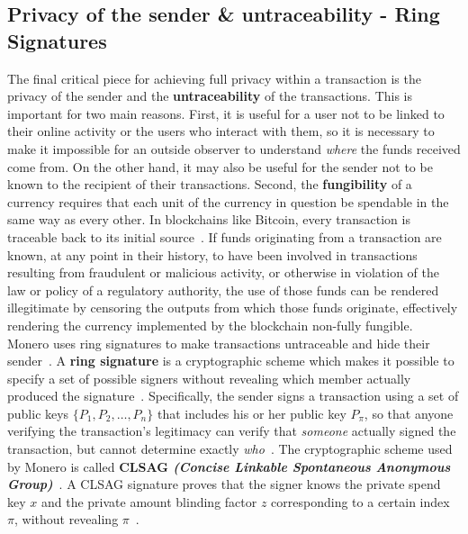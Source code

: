 \documentclass[conference]{IEEEtran}
\begin{document}

\subsection{Privacy of the sender \& untraceability - Ring Signatures}\label{subsec:ring_signatures}
The final critical piece for achieving full privacy within a transaction is the privacy of the sender and the \textbf{untraceability} of the transactions. This is important for two main reasons. First, it is useful for a user not to be linked to their online activity or the users who interact with them, so it is necessary to make it impossible for an outside observer to understand \textit{where} the funds received come from. On the other hand, it may also be useful for the sender not to be known to the recipient of their transactions. Second, the \textbf{fungibility} of a currency requires that each unit of the currency in question be spendable in the same way as every other. In blockchains like Bitcoin, every transaction is traceable back to its initial source~\cite{bitcoin_auditable}. If funds originating from a transaction are known, at any point in their history, to have been involved in transactions resulting from fraudulent or malicious activity, or otherwise in violation of the law or policy of a regulatory authority, the use of those funds can be rendered illegitimate by censoring the outputs from which those funds originate, effectively rendering the currency implemented by the blockchain non-fully fungible.\\
Monero uses ring signatures to make transactions untraceable and hide their sender~\cite{cryptonote, zero_to_monero_2}. A \textbf{ring signature} is a cryptographic scheme which makes it possible to specify a set of possible signers without revealing which member actually produced the signature~\cite{ring_signature}. Specifically, the sender signs a transaction using a set of public keys $\{P_1, P_2, \dots, P_n\}$ that includes his or her public key $P_{\pi}$, so that anyone verifying the transaction's legitimacy can verify that \textit{someone} actually signed the transaction, but cannot determine exactly \textit{who}~\cite{ringct}. The cryptographic scheme used by Monero is called \textbf{CLSAG \textit{(Concise Linkable Spontaneous Anonymous Group)}}~\cite{zero_to_monero_2, clsag}. A CLSAG signature proves that the signer knows the private spend key $x$ and the private amount blinding factor $z$ corresponding to a certain index $\pi$, without revealing $\pi$~\cite{ringct, zero_to_monero_2}.\\
\end{document}
